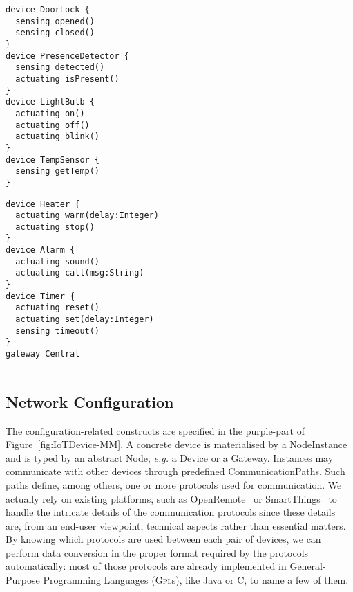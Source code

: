 \begin{center}
\begin{minipage}[t]{.42\linewidth}
\begin{lstlisting}[language=iotdsl]	
device DoorLock {
  sensing opened()
  sensing closed()
}
device PresenceDetector {
  sensing detected()
  actuating isPresent()
}
device LightBulb {
  actuating on()
  actuating off()
  actuating blink()
}	
device TempSensor {
  sensing getTemp()
}
\end{lstlisting}
\end{minipage}\hfill
\begin{minipage}[t]{.49\linewidth}
\begin{lstlisting}[language=iotdsl, firstnumber=17]
device Heater {
  actuating warm(delay:Integer)
  actuating stop()
}
device Alarm {
  actuating sound()
  actuating call(msg:String)
}
device Timer {
  actuating reset()
  actuating set(delay:Integer)
  sensing timeout()
}
gateway Central


\end{lstlisting}
\end{minipage}
\label{lis:RE-TypeDeclarations}
\end{center}


\subsection{Network Configuration}
\label{sec:IoTDSL-NetworkConfiguration}

The configuration-related constructs are specified in the purple-part of Figure~\ref{fig:IoTDevice-MM}. A concrete device is materialised by a \textsf{NodeInstance} and is typed by an abstract \textsf{Node}, \textit{e.g.} a \textsf{Device} or a \textsf{Gateway}. Instances may communicate with other \IOT devices through predefined \textsf{CommunicationPath}s. Such paths define, among others, one or more protocols used for communication. We actually rely on existing platforms, such as OpenRemote~\cite{fixme} or SmartThings~\cite{fixme} to handle the intricate details of the communication protocols since these details are, from an end-user viewpoint, technical aspects rather than essential matters. By knowing which protocols are used between each pair of devices, we can perform data conversion in the proper format required by the protocols automatically: most of those protocols are already implemented in General-Purpose Programming Languages (\textsc{Gpl}s), like Java or C, to name a few of them.

